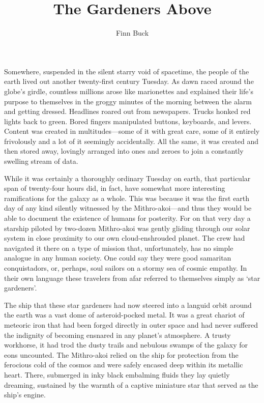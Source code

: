 \documentclass[12pt]{article}
\title{The Gardeners Above}
\author{Finn Buck}
\begin{document}
\maketitle


Somewhere,
suspended in the silent starry void of spacetime,
the people of the earth lived out another twenty-first century Tuesday.
As dawn raced around the globe's girdle,
countless millions arose like marionettes
and explained their life's purpose to themselves in the groggy minutes of the morning between the alarm and getting dressed.
Headlines roared out from newspapers.
Trucks honked red lights back to green.
Bored fingers manipulated buttons, keyboards, and levers.
Content was created in multitudes---some of it with great care,
some of it entirely frivolously
and a lot of it seemingly accidentally.
All the same, it was created and then stored away,
lovingly arranged into ones and zeroes to join a constantly swelling stream of data.

While it was certainly a thoroughly ordinary Tuesday on earth,
that particular span of twenty-four hours did, in fact, have somewhat more interesting ramifications for the galaxy as a whole.
This was because it was the first earth day of any kind silently witnessed by the Mithro-akoi---and thus they would be able to document the existence of humans for posterity.
For on that very day a starship piloted by two-dozen Mithro-akoi was gently gliding through our solar system in close proximity to our own cloud-enshrouded planet.
The crew had navigated it there on a type of mission that, unfortunately, has no simple analogue in any human society.
One could say they were good samaritan conquistadors,
or, perhaps, soul sailors on a stormy sea of cosmic empathy.
In their own language these travelers from afar referred to themselves simply as `star gardeners'.

The ship that these star gardeners had now steered into a languid orbit around the earth was a vast dome of asteroid-pocked metal.
It was a great chariot of meteoric iron that had been forged directly in outer space 
and had never suffered the indignity of becoming ensnared in any planet's atmosphere.
A trusty workhorse,
it had trod the dusty trails and nebulous swamps of the galaxy for eons uncounted.
The Mithro-akoi relied on the ship for protection from the ferocious cold of the cosmos and were safely encased deep within its metallic heart.
There,
submerged in inky black embalming fluids they lay quietly dreaming,
sustained by the warmth of a captive miniature star that served as the ship's engine.
\end{document}
